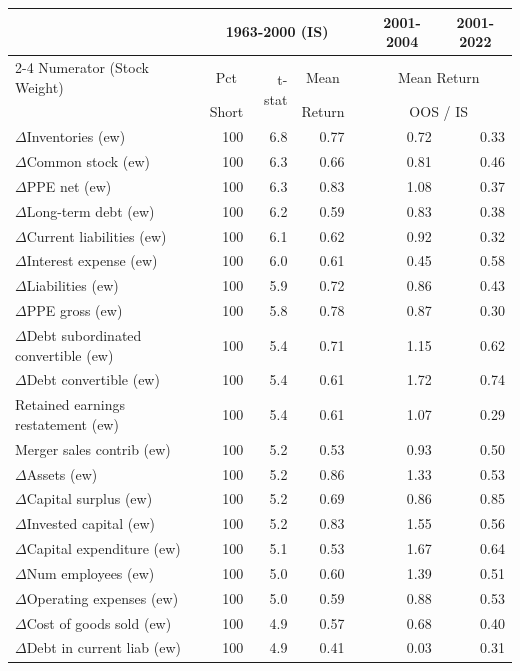 
\begin{tabular}{lrrrlrr}
\toprule
 & \multicolumn{3}{c}{1963-2000 (IS)} &  & \multicolumn{1}{c}{2001-2004} & \multicolumn{1}{c}{2001-2022} \\ \cmidrule{2-4} \cmidrule{6-7}
Numerator (Stock Weight) & \multicolumn{1}{c}{Pct} & \multirow{2}{*}{t-stat} & \multicolumn{1}{c}{Mean} &  & \multicolumn{2}{c}{Mean Return} \\  
 & \multicolumn{1}{c}{Short} &  & \multicolumn{1}{c}{Return} &  & \multicolumn{2}{c}{OOS / IS} \\ 
\midrule
$\Delta$Inventories (ew) & 100 & 6.8 & 0.77 &  & 0.72 & 0.33\\
$\Delta$Common stock (ew) & 100 & 6.3 & 0.66 &  & 0.81 & 0.46\\
$\Delta$PPE net (ew) & 100 & 6.3 & 0.83 &  & 1.08 & 0.37\\
$\Delta$Long-term debt (ew) & 100 & 6.2 & 0.59 &  & 0.83 & 0.38\\
$\Delta$Current liabilities (ew) & 100 & 6.1 & 0.62 &  & 0.92 & 0.32\\
$\Delta$Interest expense (ew) & 100 & 6.0 & 0.61 &  & 0.45 & 0.58\\
$\Delta$Liabilities (ew) & 100 & 5.9 & 0.72 &  & 0.86 & 0.43\\
$\Delta$PPE gross (ew) & 100 & 5.8 & 0.78 &  & 0.87 & 0.30\\
$\Delta$Debt subordinated convertible (ew) & 100 & 5.4 & 0.71 &  & 1.15 & 0.62\\
$\Delta$Debt convertible (ew) & 100 & 5.4 & 0.61 &  & 1.72 & 0.74\\
Retained earnings restatement (ew) & 100 & 5.4 & 0.61 &  & 1.07 & 0.29\\
Merger sales contrib (ew) & 100 & 5.2 & 0.53 &  & 0.93 & 0.50\\
$\Delta$Assets (ew) & 100 & 5.2 & 0.86 &  & 1.33 & 0.53\\
$\Delta$Capital surplus (ew) & 100 & 5.2 & 0.69 &  & 0.86 & 0.85\\
$\Delta$Invested capital (ew) & 100 & 5.2 & 0.83 &  & 1.55 & 0.56\\
$\Delta$Capital expenditure (ew) & 100 & 5.1 & 0.53 &  & 1.67 & 0.64\\
$\Delta$Num employees (ew) & 100 & 5.0 & 0.60 &  & 1.39 & 0.51\\
$\Delta$Operating expenses (ew) & 100 & 5.0 & 0.59 &  & 0.88 & 0.53\\
$\Delta$Cost of goods sold (ew) & 100 & 4.9 & 0.57 &  & 0.68 & 0.40\\
$\Delta$Debt in current liab (ew) & 100 & 4.9 & 0.41 &  & 0.03 & 0.31\\
\bottomrule
\end{tabular}
